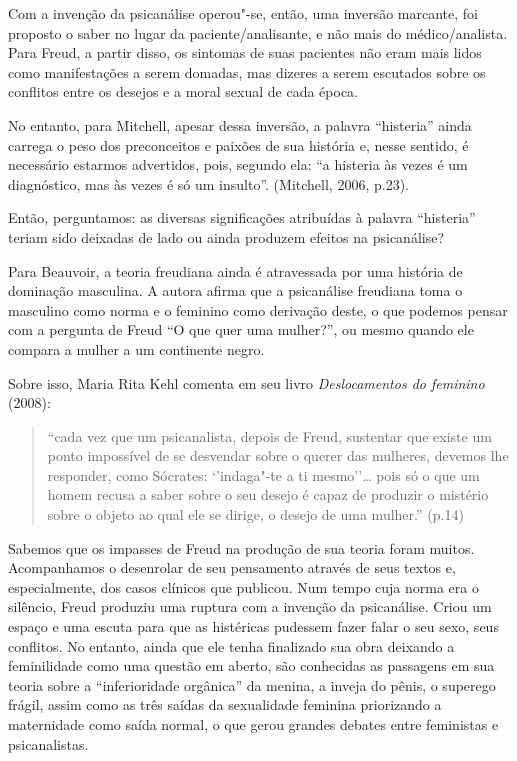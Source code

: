 Com a invenção da psicanálise operou"-se, então, uma inversão marcante,
foi proposto o saber no lugar da paciente/analisante, e não mais do
médico/analista. Para Freud, a partir disso, os sintomas de suas
pacientes não eram mais lidos como manifestações a serem domadas, mas
dizeres a serem escutados sobre os conflitos entre os desejos e a moral
sexual de cada época.

No entanto, para Mitchell, apesar dessa inversão, a palavra ``histeria''
ainda carrega o peso dos preconceitos e paixões de sua história e, nesse
sentido, é necessário estarmos advertidos, pois, segundo ela: ``a
histeria às vezes é um diagnóstico, mas às vezes é só um insulto''.
(Mitchell, 2006, p.23).

Então, perguntamos: as diversas significações atribuídas à palavra
``histeria'' teriam sido deixadas de lado ou ainda produzem efeitos na
psicanálise?

\asterisc

Para Beauvoir, a teoria freudiana ainda é atravessada por uma história
de dominação masculina. A autora afirma que a psicanálise freudiana toma
o masculino como norma e o feminino como derivação deste, o que podemos
pensar com a pergunta de Freud ``O que quer uma mulher?'', ou mesmo
quando ele compara a mulher a um continente negro.

Sobre isso, Maria Rita Kehl comenta em seu livro \emph{Deslocamentos do
feminino} (2008):

\begin{quote}
``cada vez que um psicanalista, depois de Freud, sustentar que existe um
ponto impossível de se desvendar sobre o querer das mulheres, devemos
lhe responder, como Sócrates: `'indaga"-te a ti mesmo''\ldots{} pois só o que
um homem recusa a saber sobre o seu desejo é capaz de produzir o
mistério sobre o objeto ao qual ele se dirige, o desejo de uma mulher.''
(p.14)
\end{quote}

Sabemos que os impasses de Freud na produção de sua teoria foram muitos.
Acompanhamos o desenrolar de seu pensamento através de seus textos e,
especialmente, dos casos clínicos que publicou. Num tempo cuja norma era
o silêncio, Freud produziu uma ruptura com a invenção da psicanálise.
Criou um espaço e uma escuta para que as histéricas pudessem fazer falar
o seu sexo, seus conflitos. No entanto, ainda que ele tenha finalizado
sua obra deixando a feminilidade como uma questão em aberto, são
conhecidas as passagens em sua teoria sobre a ``inferioridade orgânica''
da menina, a inveja do pênis, o superego frágil, assim como as três
saídas da sexualidade feminina priorizando a maternidade como saída
normal, o que gerou grandes debates entre feministas e psicanalistas.

